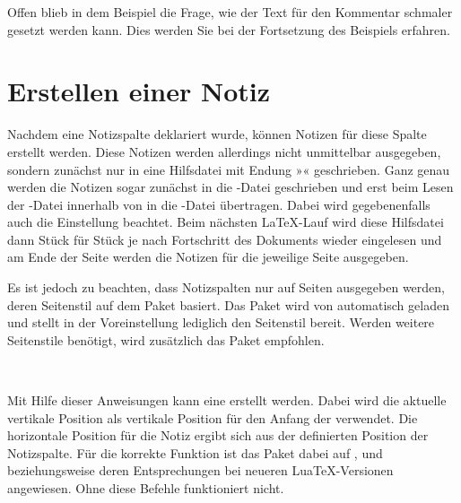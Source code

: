 %
Offen blieb in dem Beispiel die Frage, wie der Text für den Kommentar schmaler
gesetzt werden kann. Dies werden Sie bei der Fortsetzung des Beispiels
erfahren.%
\EndIndexGroup


\section{Erstellen einer Notiz}

Nachdem eine Notizspalte deklariert wurde, können Notizen für diese Spalte
erstellt werden. Diese Notizen werden allerdings nicht unmittelbar ausgegeben,
sondern zunächst nur in eine Hilfsdatei mit Endung »«
geschrieben. Ganz genau werden die Notizen sogar zunächst in die
-Datei geschrieben und erst beim Lesen der -Datei
innerhalb von  in die -Datei
übertragen. Dabei wird gegebenenfalls auch die Einstellung
 beachtet.  Beim nächsten \LaTeX-Lauf wird
diese Hilfsdatei dann Stück für Stück je nach Fortschritt des Dokuments wieder
eingelesen und am Ende der Seite werden die Notizen für die jeweilige Seite
ausgegeben.

Es ist jedoch zu beachten, dass Notizspalten nur auf Seiten
ausgegeben werden, deren Seitenstil auf dem Paket
\hyperref[cha:scrlayer]{}%
 basiert. Das Paket
\hyperref[cha:scrlayer]{} wird von
 automatisch geladen und stellt in der
Voreinstellung lediglich den Seitenstil
 bereit. Werden weitere Seitenstile
benötigt, wird zusätzlich das Paket
\hyperref[cha:scrlayer-scrpage]{}%
%
empfohlen.


\begin{Declaration}
  \\
\end{Declaration}
Mit Hilfe dieser Anweisungen kann eine  erstellt werden. Dabei
wird die aktuelle vertikale Position als vertikale Position für den Anfang der
 verwendet. Die horizontale Position für die Notiz ergibt sich
aus der definierten Position der Notizspalte. Für die korrekte Funktion ist
das Paket dabei auf ,
 und
 beziehungsweise deren
Entsprechungen bei neueren Lua\TeX-Versionen angewiesen. Ohne diese Befehle
funktioniert  nicht. %
\iffalse %
Dabei wird außerdem davon ausgegangen, dass die genannten Primitiven exakt
die Ergebnisse von PDF\TeX{} liefern.%
\fi

